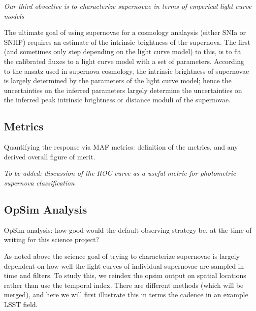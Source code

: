 {\emph{Our third obvective is to characterize supernovae in terms of emperical
    light curve models}}

The ultimate goal of using supernovae for a cosmology analaysis (either SNIa or SNIIP) requires an estimate of the intrinsic brightness of the supernova. The
first (and sometimes only step depending on the light curve model) to this, is
to fit the calibrated fluxes to a light curve model with a set of parameters.
According to the ansatz used in supernova cosmology, the intrinsic brightness of
 supernovae is largely determined by the parameters of the light curve model; 
 hence the uncertainties on the inferred parameters largely determine the
 uncertainties on the inferred peak intrinsic brightness or distance moduli of the supernovae.








\subsection{Metrics}
\label{sec:keyword:metrics}

Quantifying the response via MAF metrics: definition of the metrics,
and any derived overall figure of merit.

\emph{To be added: discussion of the ROC curve as a useful metric for photometric supernova 
classification}





\subsection{OpSim Analysis}
\label{sec:keyword:analysis}

OpSim analysis: how good would the default observing strategy be, at
the time of writing for this science project?

As noted above the science goal of trying to characterize supernovae is largely
dependent on how well the light curves of individual supernovae are sampled in
time and filters. To study this, we reindex the opsim output on spatial
locations rather than use the temporal index. There are different methods (which will be merged), and here we will first illustrate this in terms the cadence in an example LSST field.

